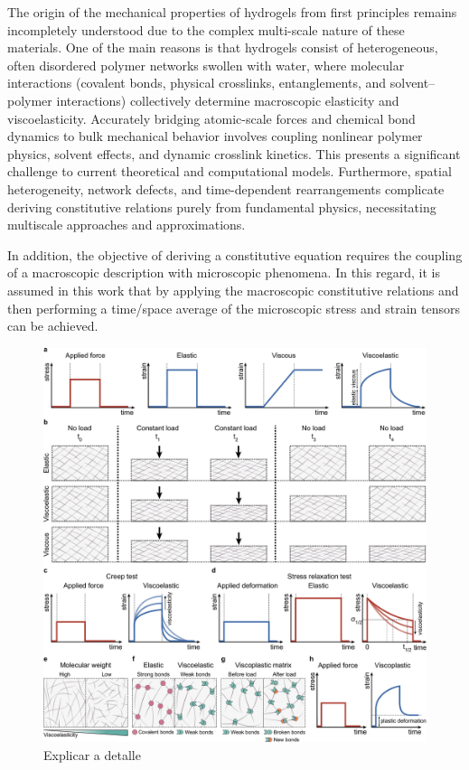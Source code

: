 The origin of the mechanical properties of hydrogels from first principles remains incompletely understood due to the complex multi-scale nature of these materials\citep{senffTemperatureSensitiveMicrogel1999}.
One of the main reasons is that hydrogels consist of heterogeneous, often disordered polymer networks swollen with water, where molecular interactions (covalent bonds, physical crosslinks, entanglements, and solvent–polymer interactions) collectively determine macroscopic elasticity and viscoelasticity. 
Accurately bridging atomic-scale forces and chemical bond dynamics to bulk mechanical behavior involves coupling nonlinear polymer physics, solvent effects, and dynamic crosslink kinetics. 
This presents a significant challenge to current theoretical and computational models. 
Furthermore, spatial heterogeneity, network defects, and time-dependent rearrangements complicate deriving constitutive relations purely from fundamental physics, necessitating multiscale approaches and approximations.

In addition, the objective of deriving a constitutive equation requires the coupling of a macroscopic description with microscopic phenomena.
In this regard, it is assumed in this work that by applying the macroscopic constitutive relations and then performing a time/space average of the microscopic stress and strain tensors can be achieved.

\begin{figure}[ht!]
    \centering
    \centering
    \includegraphics[width=\textwidth]{figs/mechResponse/0.png}
    \caption{Explicar a detalle\citep{courbotRoleExtracellularMatrix2025}}\label{fig:mechresponse0}
\end{figure}

